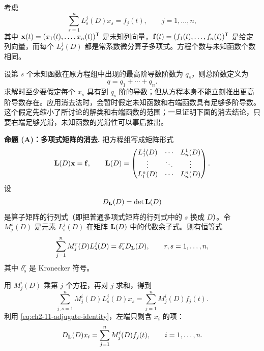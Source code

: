 考虑
\begin{equation}
 \sum_{s=1}^n L_s^j(D)x_s=f_j(t),
 \qquad j=1,\ldots,n,
 \label{eq:ch2-11-operator-system}
\end{equation}
其中 \(\vect{x}(t)=(x_1(t),\ldots,x_n(t))^{\mathsf T}\) 是未知列向量，\(\vect{f}(t)=(f_1(t),\ldots,f_n(t))^{\mathsf T}\) 是给定列向量，而每个 \(L_s^j(D)\) 都是常系数微分算子多项式。方程个数与未知函数个数相同。

设第 \(s\) 个未知函数在原方程组中出现的最高阶导数阶数为 \(q_s\)，则总阶数定义为
\begin{equation}
 q=q_1+\cdots+q_n.
 \label{eq:ch2-11-total-order}
\end{equation}
求解时至少要假定每个 \(x_s\) 具有到 \(q_s\) 阶的导数；但从方程本身不能立刻推出更高阶导数存在。应用消去法时，会暂时假定未知函数和右端函数具有足够多阶导数。这个假定先缩小了所讨论的解类和右端函数的范围；一旦证明下面的消去结论，只要右端足够光滑，未知函数的光滑性可以事后推出。

\medskip
\noindent\textbf{命题 (A)：多项式矩阵的消去.}
把方程组写成矩阵形式
\begin{equation}
 \mat{L}(D)\vect{x}=\vect{f},
 \qquad
 \mat{L}(D)=
 \begin{pmatrix}
  L_1^1(D)&\cdots&L_n^1(D)\\
  \vdots&\ddots&\vdots\\
  L_1^n(D)&\cdots&L_n^n(D)
 \end{pmatrix}.
 \label{eq:ch2-11-matrix-form}
\end{equation}
设
\begin{equation}
 D_{\mathbf{L}}(D)=\det \mathbf{L}(D)
 \label{eq:ch2-11-determinant}
\end{equation}
是算子矩阵的行列式（即把普通多项式矩阵的行列式中的 \(s\) 换成 \(D\)）。令 \(M_j^s(D)\) 是元素 \(L_s^j(D)\) 在矩阵 \(\mathbf{L}(D)\) 中的代数余子式。则有恒等式
\begin{equation}
 \sum_{j=1}^nM_j^r(D)L_s^j(D)=\delta_s^rD_{\mathbf{L}}(D),
 \qquad r,s=1,\ldots,n,
 \label{eq:ch2-11-adjugate-identity}
\end{equation}
其中 \(\delta_s^r\) 是 Kronecker 符号。

用 \(M_j^i(D)\) 乘第 \(j\) 个方程，再对 \(j\) 求和，得到
\begin{equation}
 \sum_{j,s=1}^nM_j^i(D)L_s^j(D)x_s
 =\sum_{j=1}^nM_j^i(D)f_j(t).
 \label{eq:ch2-11-elimination-sum}
\end{equation}
利用 \eqref{eq:ch2-11-adjugate-identity}，左端只剩含 \(x_i\) 的项：
\begin{equation}
 D_{\mathbf{L}}(D)x_i=\sum_{j=1}^nM_j^i(D)f_j(t),
 \qquad i=1,\ldots,n.
 \label{eq:ch2-11-decoupled-equations}
\end{equation}

